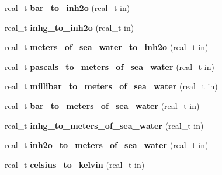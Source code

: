 \begin{DoxyCompactItemize}
\item 
\hypertarget{namespaceetk_a43272da95ece0903f1d148e188cf5445}{real\-\_\-t {\bfseries bar\-\_\-to\-\_\-inh2o} (real\-\_\-t in)}\label{namespaceetk_a43272da95ece0903f1d148e188cf5445}

\item 
\hypertarget{namespaceetk_a5e89ee01fa8db8458808b4a7b57d3a86}{real\-\_\-t {\bfseries inhg\-\_\-to\-\_\-inh2o} (real\-\_\-t in)}\label{namespaceetk_a5e89ee01fa8db8458808b4a7b57d3a86}

\item 
\hypertarget{namespaceetk_a0a5de6f89493c737d141582f78f2d373}{real\-\_\-t {\bfseries meters\-\_\-of\-\_\-sea\-\_\-water\-\_\-to\-\_\-inh2o} (real\-\_\-t in)}\label{namespaceetk_a0a5de6f89493c737d141582f78f2d373}

\item 
\hypertarget{namespaceetk_a67cf7367836704d69d177b0c2da1d7cc}{real\-\_\-t {\bfseries pascals\-\_\-to\-\_\-meters\-\_\-of\-\_\-sea\-\_\-water} (real\-\_\-t in)}\label{namespaceetk_a67cf7367836704d69d177b0c2da1d7cc}

\item 
\hypertarget{namespaceetk_a278be941dcaed72aee984f63980103a3}{real\-\_\-t {\bfseries millibar\-\_\-to\-\_\-meters\-\_\-of\-\_\-sea\-\_\-water} (real\-\_\-t in)}\label{namespaceetk_a278be941dcaed72aee984f63980103a3}

\item 
\hypertarget{namespaceetk_a7a7c345682d9e90aebf0b1dae83e678b}{real\-\_\-t {\bfseries bar\-\_\-to\-\_\-meters\-\_\-of\-\_\-sea\-\_\-water} (real\-\_\-t in)}\label{namespaceetk_a7a7c345682d9e90aebf0b1dae83e678b}

\item 
\hypertarget{namespaceetk_a235b84bf49127e2c5b3e86cb7c61dfb1}{real\-\_\-t {\bfseries inhg\-\_\-to\-\_\-meters\-\_\-of\-\_\-sea\-\_\-water} (real\-\_\-t in)}\label{namespaceetk_a235b84bf49127e2c5b3e86cb7c61dfb1}

\item 
\hypertarget{namespaceetk_a295ed6a7f27098924cb8628e2bf5636c}{real\-\_\-t {\bfseries inh2o\-\_\-to\-\_\-meters\-\_\-of\-\_\-sea\-\_\-water} (real\-\_\-t in)}\label{namespaceetk_a295ed6a7f27098924cb8628e2bf5636c}

\item 
\hypertarget{namespaceetk_a01b19536b6a9a4b252e019072d83ecd8}{real\-\_\-t {\bfseries celsius\-\_\-to\-\_\-kelvin} (real\-\_\-t in)}\label{namespaceetk_a01b19536b6a9a4b252e019072d83ecd8}


\end{DoxyCompactItemize}
